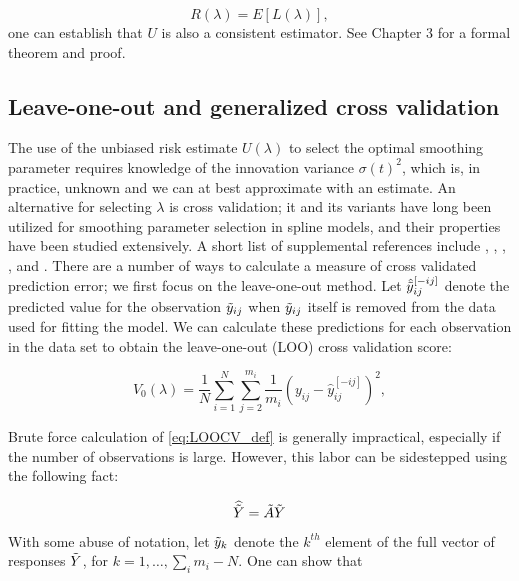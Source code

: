  \[
 R\left(\lambda\right) = E\left[L\left(\lambda\right)\right],
 \]
\noindent
one can establish that $U$ is also a consistent estimator. See \citet{gu2013smoothing} Chapter 3 for a formal theorem and proof.


\subsection{Leave-one-out and generalized cross validation}
The use of the unbiased risk estimate $U\left( \lambda \right)$ to select the optimal smoothing parameter requires knowledge of the innovation variance $\sigma\left(t \right)^2$, which is, in practice, unknown and we can at best approximate with an estimate. An alternative for selecting $\lambda$ is cross validation; it and its variants have long been utilized for smoothing parameter selection in spline models, and their properties have been studied extensively. A short list of supplemental references include \citet{craven1978smoothing}, \citet{wahba1985comparison}, \citet{hardle1988far}, \citet{hardle1992applied}, and \citet{wahba1990spline}. There are a number of ways to calculate a measure of cross validated prediction error; we first focus on the leave-one-out method. Let $\hat{\tilde{y}}^{\left[-ij\right]}_{ij}$ denote the predicted value for the observation $\tilde{y}_{ij}$ when $\tilde{y}_{ij}$ itself is removed from the data used for fitting the model. We can calculate these predictions for each observation in the data set to obtain the leave-one-out (LOO) cross validation score:

\begin{equation} \label{eq:LOOCV}
V_0\left(\lambda\right) = \frac{1}{N} \sum_{i=1}^N \sum_{j=2}^{m_i} \frac{1}{m_i} \left(  y_{ij} - \hat{y}^{\left[-ij\right]}_{ij}\right)^2, 
\end{equation}

Brute force calculation of \ref{eq:LOOCV_def} is generally impractical, especially if the number of observations is large. However, this labor can be sidestepped using the following fact: 

\begin{equation*}
\widehat{\tilde{Y}} = \tilde{A} \tilde{Y}
\end{equation*}
\noindent

With some abuse of notation, let $\tilde{y}_{k}$ denote the $k^{th}$ element of the full vector of responses $\tilde{Y}$, for $k = 1, \dots, \sum_i m_i - N$. One can show that 

